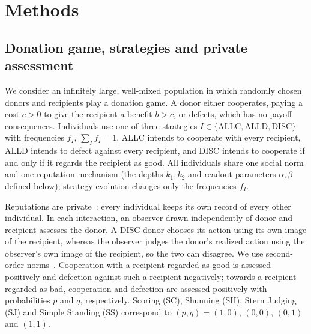 \section*{Methods}
\label{sec:methods}

\subsection*{Donation game, strategies and private assessment}

We consider an infinitely large, well-mixed population in which randomly
chosen donors and recipients play a donation game. A donor either cooperates,
paying a cost $c>0$ to give the recipient a benefit $b>c$, or defects, which has
no payoff consequences. Individuals use one of three strategies
$I\in\{\mathrm{ALLC},\mathrm{ALLD},\mathrm{DISC}\}$ with frequencies $f_I$,
$\sum_I f_I=1$. ALLC intends to cooperate with every recipient, ALLD intends to
defect against every recipient, and DISC intends to cooperate if and only if it
regards the recipient as good. All individuals share one social norm and one
reputation mechanism (the depths $k_1,k_2$ and readout parameters
$\alpha,\beta$ defined below); strategy evolution changes only the frequencies
$f_I$.

Reputations are private~\cite{okada2018,hilbe2018,radzvilavicius2019}: every
individual keeps its own record of every other individual. In each
interaction, an observer drawn independently of donor and recipient assesses
the donor. A DISC donor chooses its action using its own image of the
recipient, whereas the observer judges the donor's realized action using the
observer's own image of the recipient, so the two can disagree. We use
second-order norms~\cite{ohtsuki2004}. Cooperation with a recipient regarded as
good is assessed positively and defection against such a recipient negatively;
towards a recipient regarded as bad, cooperation and defection are assessed
positively with probabilities $p$ and $q$, respectively. Scoring (SC), Shunning
(SH), Stern Judging (SJ) and Simple Standing (SS) correspond to
$(p,q)=(1,0)$, $(0,0)$, $(0,1)$ and $(1,1)$.


